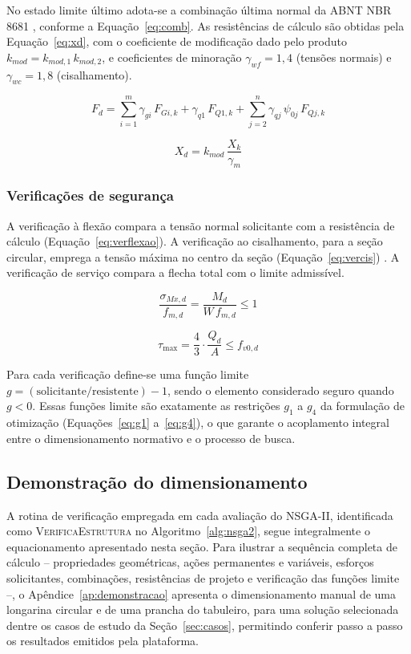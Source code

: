 No estado limite último adota-se a combinação última normal da ABNT NBR 8681 \parencite{NBR8681:2025}, conforme a Equação~\eqref{eq:comb}. As resistências de cálculo são obtidas pela Equação~\eqref{eq:xd}, com o coeficiente de modificação dado pelo produto $k_{mod} = k_{mod,1}\,k_{mod,2}$, e coeficientes de minoração $\gamma_{wf} = 1{,}4$ (tensões normais) e $\gamma_{wc} = 1{,}8$ (cisalhamento).

\begin{equation}
F_d = \sum_{i=1}^{m}\gamma_{gi}\,F_{Gi,k} + \gamma_{q1}\,F_{Q1,k} + \sum_{j=2}^{n}\gamma_{qj}\,\psi_{0j}\,F_{Qj,k}
\label{eq:comb}
\end{equation}

\begin{equation}
X_d = k_{mod}\,\frac{X_k}{\gamma_m}
\label{eq:xd}
\end{equation}

\subsubsection{Verificações de segurança}

A verificação à flexão compara a tensão normal solicitante com a resistência de cálculo (Equação~\eqref{eq:verflexao}). A verificação ao cisalhamento, para a seção circular, emprega a tensão máxima no centro da seção (Equação~\eqref{eq:vercis}) \parencite{Moraes2023}. A verificação de serviço compara a flecha total com o limite admissível.

\begin{equation}
\frac{\sigma_{Mx,d}}{f_{m,d}} = \frac{M_d}{W\,f_{m,d}} \leq 1
\label{eq:verflexao}
\end{equation}

\begin{equation}
\tau_{\max} = \frac{4}{3}\cdot\frac{Q_d}{A} \leq f_{v0,d}
\label{eq:vercis}
\end{equation}

Para cada verificação define-se uma função limite $g = (\text{solicitante}/\text{resistente}) - 1$, sendo o elemento considerado seguro quando $g < 0$. Essas funções limite são exatamente as restrições $g_1$ a $g_4$ da formulação de otimização (Equações~\eqref{eq:g1} a~\eqref{eq:g4}), o que garante o acoplamento integral entre o dimensionamento normativo e o processo de busca.

\subsection{Demonstração do dimensionamento}\label{sec:demonstracao}

A rotina de verificação empregada em cada avaliação do NSGA-II, identificada como \textsc{VerificaEstrutura} no Algoritmo~\ref{alg:nsga2}, segue integralmente o equacionamento apresentado nesta seção. Para ilustrar a sequência completa de cálculo -- propriedades geométricas, ações permanentes e variáveis, esforços solicitantes, combinações, resistências de projeto e verificação das funções limite --, o Apêndice~\ref{ap:demonstracao} apresenta o dimensionamento manual de uma longarina circular e de uma prancha do tabuleiro, para uma solução selecionada dentre os casos de estudo da Seção~\ref{sec:casos}, permitindo conferir passo a passo os resultados emitidos pela plataforma.
